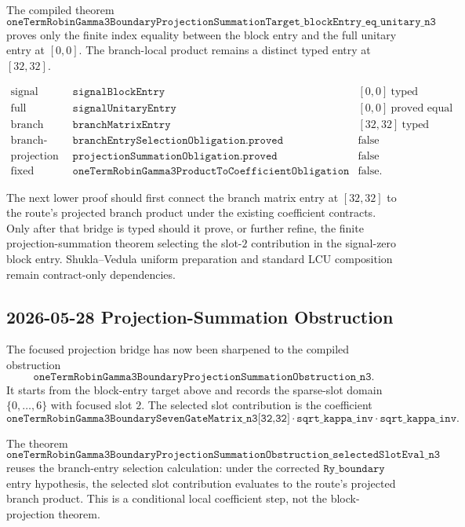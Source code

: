 The compiled theorem
\[
  \texttt{oneTermRobinGamma3BoundaryProjectionSummationTarget\_blockEntry\_eq\_unitary\_n3}
\]
proves only the finite index equality between the block entry and the full
unitary entry at \([0,0]\).  The branch-local product remains a distinct typed
entry at \([32,32]\).

\[
\begin{array}{lll}
\text{signal block entry} & \texttt{signalBlockEntry} & [0,0]\ \text{typed}\\
\text{full unitary entry} & \texttt{signalUnitaryEntry} & [0,0]\ \text{proved equal to the signal block entry}\\
\text{branch matrix entry} & \texttt{branchMatrixEntry} & [32,32]\ \text{typed}\\
\text{branch-entry selection} & \texttt{branchEntrySelectionObligation.proved} & \text{false}\\
\text{projection summation} & \texttt{projectionSummationObligation.proved} & \text{false}\\
\text{fixed product theorem} & \texttt{oneTermRobinGamma3ProductToCoefficientObligation\ 3\ 0\ 0} & \text{false}.
\end{array}
\]

The next lower proof should first connect the branch matrix entry at
\([32,32]\) to the route's projected branch product under the existing
coefficient contracts.  Only after that bridge is typed should it prove, or
further refine, the finite projection-summation theorem selecting the slot-\(2\)
contribution in the signal-zero block entry.  Shukla--Vedula uniform
preparation and standard LCU composition remain contract-only dependencies.

\subsection{2026-05-28 Projection-Summation Obstruction}

The focused projection bridge has now been sharpened to the compiled
obstruction
\[
  \texttt{oneTermRobinGamma3BoundaryProjectionSummationObstruction\_n3}.
\]
It starts from the block-entry target above and records the sparse-slot domain
\(\{0,\ldots,6\}\) with focused slot \(2\).  The selected slot contribution is
the coefficient
\[
  \texttt{oneTermRobinGamma3BoundarySevenGateMatrix\_n3[32,32]}
  \cdot \texttt{sqrt\_kappa\_inv}\cdot \texttt{sqrt\_kappa\_inv}.
\]

The theorem
\[
  \texttt{oneTermRobinGamma3BoundaryProjectionSummationObstruction\_selectedSlotEval\_n3}
\]
reuses the branch-entry selection calculation: under the corrected
\(\texttt{Ry\_boundary}\) entry hypothesis, the selected slot contribution
evaluates to the route's projected branch product.  This is a conditional
local coefficient step, not the block-projection theorem.

